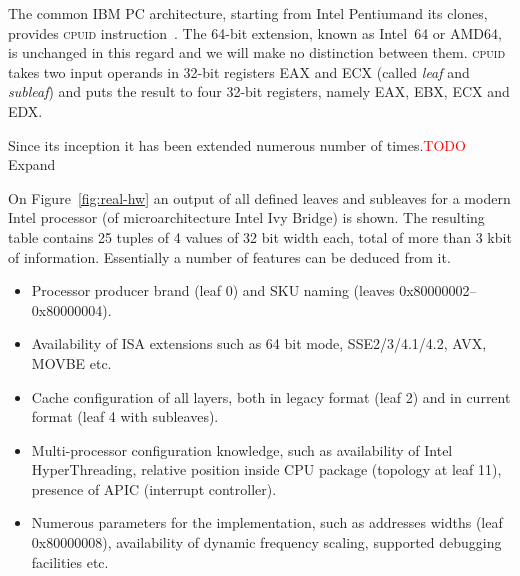 \documentclass[a4paper,10pt,oneside,unicode]{article}
\newcommand{\cpuid}{\textsc{cpuid} }
\newcommand{\todo}[1][]{\textcolor{red}{TODO #1}}
\begin{document}
The common IBM PC architecture, starting from Intel Pentium\texttrademark and its clones, provides \cpuid instruction~\cite{intelmanual-7vols, amd-sdm-vol1}. The 64-bit extension, known as Intel~64 or AMD64, is unchanged in this regard and we will make no distinction between them. \cpuid takes two input operands in 32-bit registers EAX and ECX (called \textit{leaf} and \textit{subleaf}) and puts the result to four 32-bit registers, namely EAX, EBX, ECX and EDX.

Since its inception it has been extended numerous number of times.\todo{Expand}

On Figure~\ref{fig:real-hw} an output of all defined leaves and subleaves for a modern Intel processor (of microarchitecture Intel Ivy Bridge) is shown. The resulting table contains 25 tuples of 4 values of 32 bit width each, total of more than 3 kbit of information. Essentially a number of features can be deduced from it.
\begin{itemize}
    \item Processor producer brand (leaf 0) and SKU naming (leaves 0x80000002--0x80000004).
    \item Availability of ISA extensions such as 64 bit mode, SSE2/3/4.1/4.2, AVX, MOVBE etc.
    \item Cache configuration of all layers, both in legacy format (leaf 2) and in current format (leaf 4 with subleaves).
    \item Multi-processor configuration knowledge, such as availability of Intel HyperThreading, relative position inside {CPU} package (topology at leaf 11), presence of {APIC} (interrupt controller).
    \item Numerous parameters for the implementation, such as addresses widths (leaf 0x80000008), availability of dynamic frequency scaling, supported debugging facilities etc.
\end{itemize}
\end{document}
